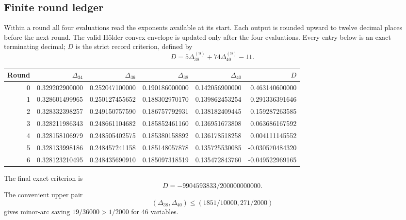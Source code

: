 \documentclass[11pt,letterpaper]{article}
\numberwithin{equation}{section}
\begin{document}
\subsection{Finite round ledger}
Within a round all four evaluations read the exponents available at its start.
Each output is rounded upward to twelve decimal places before the next round.
The valid H\"older convex envelope is updated only after the four evaluations.
Every entry below is an exact terminating decimal; $D$ is the strict
record criterion, defined by
\[D=5\Delta_{38}^{(9)}+74\Delta_{40}^{(9)}-11.\]
\begin{center}
\small
\setlength{\tabcolsep}{4pt}
\begin{tabular}{rrrrrr}
\toprule
Round & $\Delta_{34}$ & $\Delta_{36}$ & $\Delta_{38}$ & $\Delta_{40}$ & $D$\\
\midrule
0 & 0.329202900000 & 0.252047100000 & 0.190186000000 & 0.142056900000 & 0.463140600000\\
1 & 0.328601499965 & 0.250127455652 & 0.188302970170 & 0.139862453254 & 0.291336391646\\
2 & 0.328332398257 & 0.249150757590 & 0.186757792931 & 0.138182409445 & 0.159287263585\\
3 & 0.328211986343 & 0.248661104682 & 0.185852461160 & 0.136951673808 & 0.063686167592\\
4 & 0.328158106979 & 0.248505402575 & 0.185380158892 & 0.136178518258 & 0.004111145552\\
5 & 0.328133998186 & 0.248457241158 & 0.185148057878 & 0.135725530085 & -0.030570484320\\
6 & 0.328123210495 & 0.248435690910 & 0.185097318519 & 0.135472843760 & -0.049522969165\\
\bottomrule
\end{tabular}
\end{center}
The final exact criterion is
\[D=-9904593833/200000000000.\]
The convenient upper pair
\[(\Delta_{38},\Delta_{40})\le(1851/10000,271/2000)\]
gives minor-arc saving $19/36000>1/2000$ for 46 variables.
\end{document}
